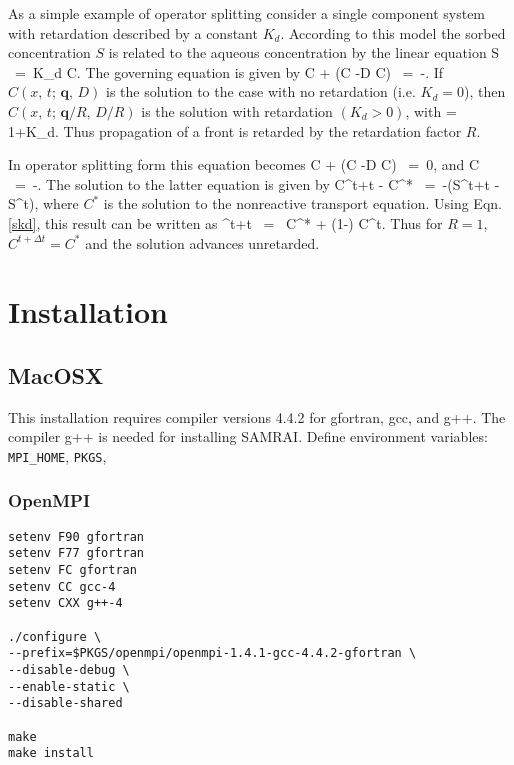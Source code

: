 \documentclass[12pt]{article}
\def\EQ#1\EN{\begin{equation}#1\end{equation}}
\newcommand{\eq}{\ =\ }
\newcommand{\p}{{\partial}}
\newcommand{\bnabla}{\boldsymbol{\nabla}}
\newcommand{\bq}{\boldsymbol{q}}
\begin{document}
As a simple example of operator splitting consider a single component system with retardation described by a constant $K_d$. According to this model the sorbed concentration $S$ is related to the aqueous concentration by the linear equation
\EQ\label{skd}
S \eq K_d C.
\EN
The governing equation is given by
\EQ
\frac{\p}{\p t} \varphi C + \bnabla\cdot\big(\bq C -\varphi D \bnabla C\big) \eq -\frac{\p S}{\p t}.
\EN
If $C(x,\,t;\, \bq,\,D)$ is the solution to the case with no retardation (i.e. $K_d=0$), then $C(x,\,t;\, \bq/R,\,D/R)$ is the solution with retardation $(K_d>0)$,
with
\EQ
R = 1+K_d.
\EN
Thus propagation of a front is retarded by the retardation factor $R$.

In operator splitting form this equation becomes
\EQ
\frac{\p}{\p t} \varphi C + \bnabla\cdot\big(\bq C -\varphi D \bnabla C\big) \eq 0,
\EN
and
\EQ
\frac{d}{d t} \varphi C \eq -.
\EN
The solution to the latter equation is given by
\EQ
\varphi C^{t+\Delta t} - \varphi C^* \eq -\big(S^{t+\Delta t} - S^t\big),
\EN
where $C^*$ is the solution to the nonreactive transport equation. Using Eqn.\eqref{skd}, this result can be written as
\EQ
C^{t+\Delta t} \eq {} C^* + \left(1-\right) C^t.
\EN
Thus for $R=1$, $C^{t+\Delta t}=C^*$ and the solution advances unretarded.

\newpage

\section{Installation}

\subsection{MacOSX}

This installation requires compiler versions 4.4.2 for gfortran, gcc, and g++. The compiler g++ is needed for installing SAMRAI.
Define environment variables: {\tt MPI\_HOME}, {\tt PKGS}, 

\subsubsection{OpenMPI}

\begin{verbatim}
setenv F90 gfortran
setenv F77 gfortran
setenv FC gfortran
setenv CC gcc-4
setenv CXX g++-4

./configure \
--prefix=$PKGS/openmpi/openmpi-1.4.1-gcc-4.4.2-gfortran \
--disable-debug \
--enable-static \
--disable-shared

make
make install
\end{verbatim}
\end{document}
